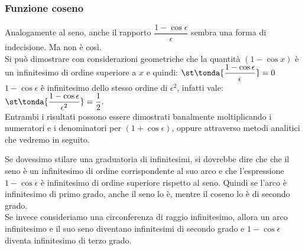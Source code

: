 \subsubsection{Funzione coseno}
\label{subsubsec:insnum_fcoseno}
Analogamente al seno, anche il rapporto \(\dfrac{1-\cos \epsilon}{\epsilon}\)
sembra una forma di indecisione. 
Ma non è così. \\

Si può dimostrare con considerazioni geometriche che 
la quantità $(1-\cos x)$ è un infinitesimo di ordine superiore a 
$x$ e quindi: \qquad
\(\displaystyle
 \st\tonda{\frac{1-\cos \epsilon}{\epsilon}}=0
\) \\

$1-\cos \epsilon$ è infinitesimo dello stesso ordine di $\epsilon^2$, 
infatti vale: \qquad
\(\displaystyle
 \st\tonda{\frac{1-\cos \epsilon}{\epsilon^2}}=\frac{1}{2}.
\) \\

Entrambi i risultati possono essere dimostrati banalmente moltiplicando i 
numeratori e i denominatori per $(1+\cos \epsilon)$, oppure attraverso 
metodi analitici che vedremo in seguito.

\begin{osservazione}
Se dovessimo stilare una graduatoria di infinitesimi, si dovrebbe dire che 
che il seno è un infinitesimo di ordine corrispondente al suo arco e che 
l'espressione $1-\cos \epsilon$ è infinitesimo di ordine superiore 
rispetto al seno.
Quindi se l'arco è infinitesimo di primo grado, anche il seno lo è, mentre
il coseno lo è di secondo grado.\\
Se invece consideriamo una circonferenza di raggio infinitesimo, 
allora un arco infinitesimo e il suo seno diventano infinitesimi di secondo 
grado e $1-\cos \epsilon$ diventa infinitesimo di terzo grado.
\end{osservazione}

